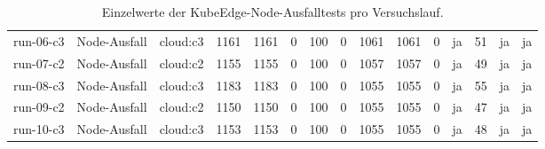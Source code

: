\begin{table}
\begin{tabular}{l l p{3.2cm} r r r r r r r r r r r r}
run-06-c3 & Node-Ausfall & cloud:c3 & 1161 & 1161 & 0 & 100 & 0 & 1061 & 1061 & 0 & ja & 51 & ja & ja \\
run-07-c2 & Node-Ausfall & cloud:c2 & 1155 & 1155 & 0 & 100 & 0 & 1057 & 1057 & 0 & ja & 49 & ja & ja \\
run-08-c3 & Node-Ausfall & cloud:c3 & 1183 & 1183 & 0 & 100 & 0 & 1055 & 1055 & 0 & ja & 55 & ja & ja \\
run-09-c2 & Node-Ausfall & cloud:c2 & 1150 & 1150 & 0 & 100 & 0 & 1055 & 1055 & 0 & ja & 47 & ja & ja \\
run-10-c3 & Node-Ausfall & cloud:c3 & 1153 & 1153 & 0 & 100 & 0 & 1055 & 1055 & 0 & ja & 48 & ja & ja \\
\bottomrule
\end{tabular}
\caption{Einzelwerte der KubeEdge-Node-Ausfalltests pro Versuchslauf.}
\label{tab:appendix-kubeedge-node-failure-runs}
\end{table}
